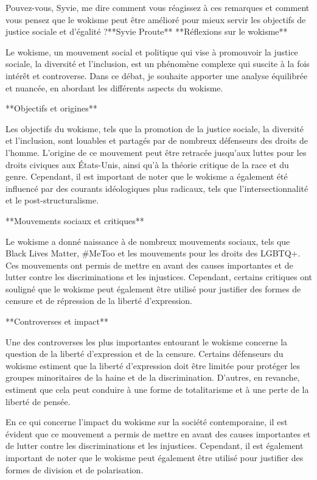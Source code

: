 Pouvez-vous, Syvie, me dire comment vous réagissez à ces remarques et comment vous pensez que le wokisme peut être amélioré pour mieux servir les objectifs de justice sociale et d'égalité ?**Syvie Proute**
**Réflexions sur le wokisme**

Le wokisme, un mouvement social et politique qui vise à promouvoir la justice sociale, la diversité et l'inclusion, est un phénomène complexe qui suscite à la fois intérêt et controverse. Dans ce débat, je souhaite apporter une analyse équilibrée et nuancée, en abordant les différents aspects du wokisme.

**Objectifs et origines**

Les objectifs du wokisme, tels que la promotion de la justice sociale, la diversité et l'inclusion, sont louables et partagés par de nombreux défenseurs des droits de l'homme. L'origine de ce mouvement peut être retracée jusqu'aux luttes pour les droits civiques aux États-Unis, ainsi qu'à la théorie critique de la race et du genre. Cependant, il est important de noter que le wokisme a également été influencé par des courants idéologiques plus radicaux, tels que l'intersectionnalité et le post-structuralisme.

**Mouvements sociaux et critiques**

Le wokisme a donné naissance à de nombreux mouvements sociaux, tels que Black Lives Matter, #MeToo et les mouvements pour les droits des LGBTQ+. Ces mouvements ont permis de mettre en avant des causes importantes et de lutter contre les discriminations et les injustices. Cependant, certains critiques ont souligné que le wokisme peut également être utilisé pour justifier des formes de censure et de répression de la liberté d'expression.

**Controverses et impact**

Une des controverses les plus importantes entourant le wokisme concerne la question de la liberté d'expression et de la censure. Certains défenseurs du wokisme estiment que la liberté d'expression doit être limitée pour protéger les groupes minoritaires de la haine et de la discrimination. D'autres, en revanche, estiment que cela peut conduire à une forme de totalitarisme et à une perte de la liberté de pensée.

En ce qui concerne l'impact du wokisme sur la société contemporaine, il est évident que ce mouvement a permis de mettre en avant des causes importantes et de lutter contre les discriminations et les injustices. Cependant, il est également important de noter que le wokisme peut également être utilisé pour justifier des formes de division et de polarisation.

